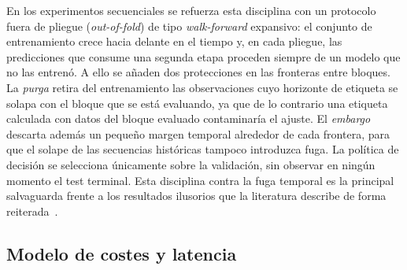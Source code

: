 En los experimentos secuenciales se refuerza esta disciplina con un protocolo fuera de
pliegue (\emph{out-of-fold}) de tipo \emph{walk-forward} expansivo: el conjunto de
entrenamiento crece hacia delante en el tiempo y, en cada pliegue, las predicciones que
consume una segunda etapa proceden siempre de un modelo que no las entrenó. A ello se añaden
dos protecciones en las fronteras entre bloques. La \emph{purga} retira del entrenamiento las
observaciones cuyo horizonte de etiqueta se solapa con el bloque que se está evaluando, ya
que de lo contrario una etiqueta calculada con datos del bloque evaluado contaminaría el
ajuste. El \emph{embargo} descarta además un pequeño margen temporal alrededor de cada
frontera, para que el solape de las secuencias históricas tampoco introduzca fuga. La
política de decisión se selecciona únicamente sobre la validación, sin observar en ningún
momento el test terminal. Esta disciplina contra la fuga temporal es la principal salvaguarda
frente a los resultados ilusorios que la literatura describe de forma
reiterada~\cite{lopezdeprado2018,gu2020empirical}.

\subsection{Modelo de costes y latencia}

